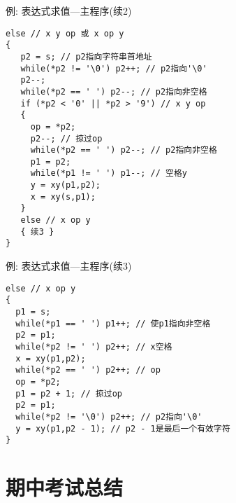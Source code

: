 \begin{frame}{例: 表达式求值---主程序(续2)}
\begin{lstlisting}
else // x y op 或 x op y 
{
   p2 = s; // p2指向字符串首地址 
   while(*p2 != '\0') p2++; // p2指向'\0'
   p2--;
   while(*p2 == ' ') p2--; // p2指向非空格
   if (*p2 < '0' || *p2 > '9') // x y op 
   {
     op = *p2;
     p2--; // 掠过op
     while(*p2 == ' ') p2--; // p2指向非空格
     p1 = p2;
     while(*p1 != ' ') p1--; // 空格y
     y = xy(p1,p2);
     x = xy(s,p1);
   }
   else // x op y 
   { 续3 }
}
\end{lstlisting}
\end{frame}

\begin{frame}{例: 表达式求值---主程序(续3)}
\begin{lstlisting}
else // x op y 
{
  p1 = s;
  while(*p1 == ' ') p1++; // 使p1指向非空格
  p2 = p1;
  while(*p2 != ' ') p2++; // x空格
  x = xy(p1,p2);
  while(*p2 == ' ') p2++; // op
  op = *p2;
  p1 = p2 + 1; // 掠过op
  p2 = p1;
  while(*p2 != '\0') p2++; // p2指向'\0'
  y = xy(p1,p2 - 1); // p2 - 1是最后一个有效字符 	
} 
\end{lstlisting}
\end{frame}

\section{期中考试总结}

